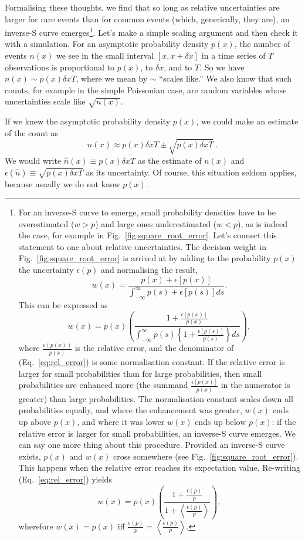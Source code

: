 \documentclass[a4paper, 12pt]{article}
\newcommand{\ave}[1]{\left\langle#1 \right\rangle}
\newcommand{\elabel}[1]{\label{eq:#1}}
\newcommand{\eref}[1]{(Eq.~\ref{eq:#1})}
\newcommand{\fref}[1]{Fig.~\ref{fig:#1}}
\newcommand{\err}{\epsilon}
\newcommand{\be}{\begin{equation}}
\newcommand{\ee}{\end{equation}}
\begin{document}
Formalising these thoughts, we find that so long as relative uncertainties are larger for rare events than for common events (which, generically, they are), an inverse-S curve emerges\footnote{
For an inverse-S curve to emerge, small probability densities have to be overestimated ($w>p$) and large ones underestimated ($w<p$), as is indeed the case, for example in \fref{square_root_error}. Let's connect this statement to one about relative uncertainties. The decision weight in \fref{square_root_error} is 
arrived at by adding to the probability $p(x)$ the uncertainty $\err{(p)}$ and normalising the result, 
\be
w(x)=\frac{p(x)+\err[p(x)]}{\int_{-\infty}^{\infty} p(s)+\err[p(s)] ds}.
\ee
This can be expressed as
\be
w(x)=p(x) \left(\frac{1+\frac{\err[p(x)]}{p(x)}}{\int_{-\infty}^{\infty} p(s)\left\{1+\frac{\err[p(s)]}{p(s)}\right\} ds}\right),
\elabel{rel_error}
\ee
where $\frac{\err(p(x))}{p(x)}$ is the relative error, and the denominator of  \eref{rel_error} is some normalisation constant. If the relative error is larger for small probabilities than for large probabilities, then small probabilities are enhanced more (the summand $\frac{\err[p(x)]}{p(x)}$ in the numerator is greater) than large probabilities. The normalisation constant scales down all probabilities equally, and where the enhancement was greater, $w(x)$ ends up above $p(x)$, and where it was lower $w(x)$ ends up below $p(x)$: if the relative error is larger for small probabilities, an inverse-S curve emerges.
We can say one more thing about this procedure. Provided an inverse-S curve exists, $p(x)$ and $w(x)$ cross somewhere (see \fref{square_root_error}). This happens when the relative error reaches its expectation value. Re-writing \eref{rel_error} yields
\be
w(x)=p(x) \left(\frac{1+\frac{\err(p)}{p}}{1+\ave{\frac{\err(p)}{p}}}\right),
\ee
wherefore $w(x)=p(x)$ iff $\frac{\err(p)}{p}=\ave{\frac{\err(p)}{p}}.$
}.
Let's make a simple scaling argument and then check it with a simulation. For an asymptotic probability density $p(x)$, the number of events $n(x)$ we see in the small interval $[x, x+ \delta x]$ in a time series of $T$ observations is proportional to $p(x)$, to $\delta x$, and to $T$. So we have $n(x) \sim p(x) \delta x T$, where we mean by $\sim$ ``scales like.'' We also know that such counts, for example in the simple Poissonian case, are random variables whose uncertainties scale like $\sqrt{n(x)}$.

If we knew the asymptotic probability density $p(x)$, we could make an estimate of the count as
\be
n(x) \approx p(x) \delta x T \pm \sqrt{p(x) \delta x T} ~.
\elabel{count_est}
\ee
We would write $\hat{n}(x) \equiv p(x) \delta x T$ as the estimate of $n(x)$ and $\err(\hat{n}) \equiv \sqrt{p(x) \delta x T}$ as its uncertainty. Of course, this situation seldom applies, because usually we do not know $p(x)$.
\end{document}
